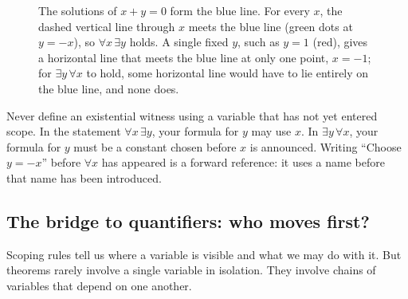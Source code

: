 \begin{figure}[htbp]
\centering
{}
\caption{The solutions of $x + y = 0$ form the blue line. For every $x$, the dashed vertical line through $x$ meets the blue line (green dots at $y = -x$), so $\forall x \, \exists y$ holds. A single fixed $y$, such as $y = 1$ (red), gives a horizontal line that meets the blue line at only one point, $x = -1$; for $\exists y \, \forall x$ to hold, some horizontal line would have to lie entirely on the blue line, and none does.}
\label{03:fig-line-picture}
\end{figure}

\begin{trapbox}
Never define an existential witness using a variable that has not yet entered scope. In the statement $\forall x \, \exists y$, your formula for $y$ may use $x$. In $\exists y \, \forall x$, your formula for $y$ must be a constant chosen before $x$ is announced. Writing ``Choose $y = -x$'' before $\forall x$ has appeared is a forward reference: it uses a name before that name has been introduced.
\end{trapbox}

\subsection{The bridge to quantifiers: who moves first?}

Scoping rules tell us where a variable is visible and what we may do with it. But theorems rarely involve a single variable in isolation. They involve chains of variables that depend on one another.

